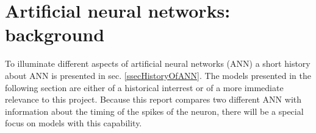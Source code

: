 % 			
% 			
% 			
% 			
% 			
% 			

\section{Artificial neural networks: background}

To illuminate different aspects of artificial neural networks (ANN) a short history about ANN is presented in sec. \ref{ssecHistoryOfANN}. 
The models presented in the following section are either of a historical interrest or of a more immediate relevance to this project.
Because this report compares two different ANN with information about the timing of the spikes of the neuron, there will be a special focus on models with this capability. 



